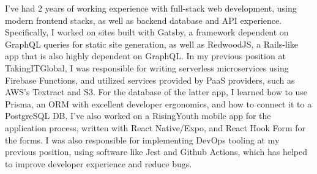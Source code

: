 \documentclass[11pt, a4paper]{awesome-cv}
\begin{document}
\begin{cvletter}
I've had 2 years of working experience with full-stack web development, 
using modern frontend stacks, as well as backend database and API experience.
Specifically, I worked on sites built with Gatsby, 
a framework dependent on GraphQL queries for static site generation,
as well as RedwoodJS, a Rails-like app that is also highly dependent on GraphQL.
In my previous position at TakingITGlobal, 
I was responsible for writing serverless microservices using Firebase Functions, 
and utilized services provided by PaaS providers, such as AWS's Textract and S3.
For the database of the latter app, I learned how to use Prisma, an ORM with excellent developer ergonomics,
and how to connect it to a PostgreSQL DB.
I've also worked on a RisingYouth mobile app for the application process,
written with React Native/Expo, and React Hook Form for the forms.
I was also responsible for implementing DevOps tooling at my previous position,
using software like Jest and Github Actions,
which has helped to improve developer experience and reduce bugs.

\end{cvletter}
\end{document}
